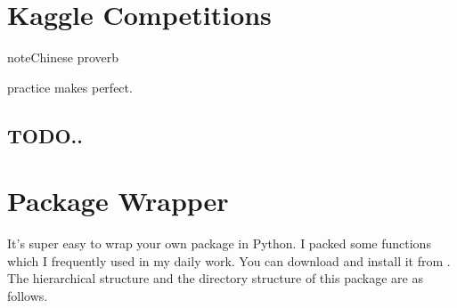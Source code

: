 \documentclass[letterpaper,12pt,english]{sphinxmanual}
\begin{document}
\begin{sphinxVerbatim}[commandchars=\\\{\}]
               
\end{sphinxVerbatim}


\chapter{Kaggle Competitions}
\label{\detokenize{kaggle:kaggle-competitions}}\label{\detokenize{kaggle:kaggle}}\label{\detokenize{kaggle::doc}}
\begin{sphinxadmonition}{note}{Chinese proverb}

practice makes perfect.
\end{sphinxadmonition}


\section{TODO..}
\label{\detokenize{kaggle:todo}}

\chapter{Package Wrapper}
\label{\detokenize{pack:package-wrapper}}\label{\detokenize{pack:pack}}\label{\detokenize{pack::doc}}
It’s super easy to wrap your own package in Python. I packed some functions which I frequently
used in my daily work. You can download and install it from . The hierarchical
structure and the directory structure of this package are as follows.
\end{document}
